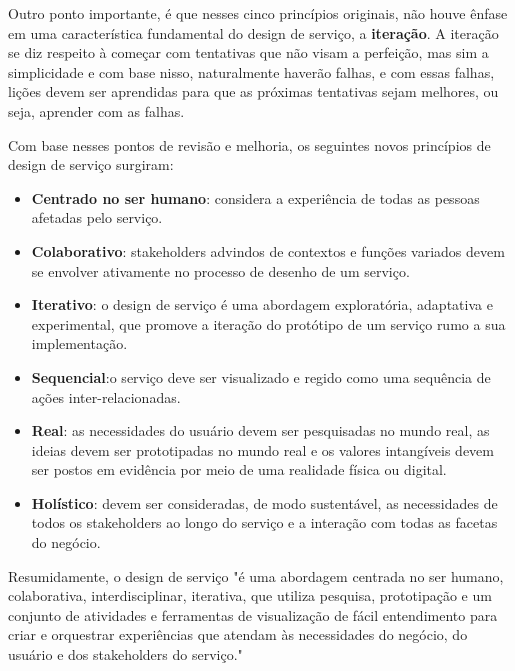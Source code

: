 Outro ponto importante, é que nesses cinco princípios originais, não houve ênfase em uma característica fundamental do design de serviço, a \textbf{iteração}. A iteração se diz respeito à começar com tentativas que não visam a perfeição, mas sim a simplicidade e com base nisso, naturalmente haverão falhas, e com essas falhas, lições devem ser aprendidas para que as próximas tentativas sejam melhores, ou seja, aprender com as falhas.

Com base nesses pontos de revisão e melhoria, os seguintes novos princípios de design de serviço surgiram: \cite{Stickdorn2019}

\begin{itemize}
	\item \textbf{Centrado no ser humano}: considera a experiência de todas as pessoas afetadas pelo serviço.
	\item \textbf{Colaborativo}: stakeholders advindos de contextos e funções variados devem se envolver ativamente no processo de desenho de um serviço.
	\item \textbf{Iterativo}: o design de serviço é uma abordagem exploratória, adaptativa e experimental, que promove a iteração do protótipo de um serviço rumo a sua implementação.
	\item \textbf{Sequencial}:o serviço deve ser visualizado e regido como uma sequência de ações inter-relacionadas.
	\item \textbf{Real}: as necessidades do usuário devem ser pesquisadas no mundo real, as ideias devem ser prototipadas no mundo real e os valores intangíveis devem ser postos em evidência por meio de uma realidade física ou digital.
	\item \textbf{Holístico}:  devem ser consideradas, de modo sustentável, as necessidades de todos os stakeholders ao longo do serviço e a interação com todas as facetas do negócio.
\end{itemize}

Resumidamente, o design de serviço "é uma abordagem centrada no ser humano, colaborativa, interdisciplinar, iterativa, que utiliza pesquisa, prototipação e um conjunto de atividades e ferramentas de visualização de fácil entendimento para criar e orquestrar experiências que atendam às necessidades do negócio, do usuário e dos stakeholders do serviço."\cite{Stickdorn2019}


